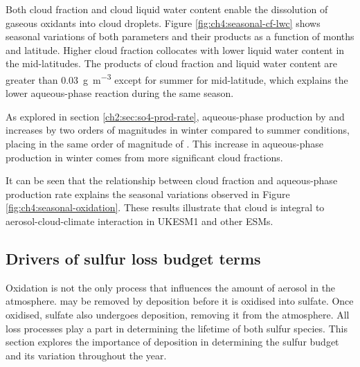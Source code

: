 Both cloud fraction and cloud liquid water content enable the dissolution of gaseous oxidants into cloud droplets. Figure \ref{fig:ch4:seasonal-cf-lwc} shows seasonal variations of both parameters and their products as a function of months and latitude. Higher cloud fraction collocates with lower liquid water content in the mid-latitudes. The products of cloud fraction and liquid water content are greater than \qty{0.03}{\gram\per\cubic\metre} except for summer for mid-latitude, which explains the lower aqueous-phase reaction during the same season. 

As explored in section \ref{ch2:sec:so4-prod-rate}, aqueous-phase production by  and  increases by two orders of magnitudes in winter compared to summer conditions, placing  in the same order of magnitude of . This increase in aqueous-phase production in winter comes from more significant cloud fractions. 

It can be seen that the relationship between cloud fraction and aqueous-phase production rate explains the seasonal variations observed in Figure \ref{fig:ch4:seasonal-oxidation}. These results illustrate that cloud is integral to aerosol-cloud-climate interaction in UKESM1 and other ESMs. 


\subsection{Drivers of sulfur loss budget terms}
\label{ch4:sec:sulfur-loss}

Oxidation is not the only process that influences the amount of aerosol in the atmosphere.  may be removed by deposition before it is oxidised into sulfate. Once oxidised, sulfate also undergoes deposition, removing it from the atmosphere. All loss processes play a part in determining the lifetime of both sulfur species. This section explores the importance of deposition in determining the sulfur budget and its variation throughout the year.

